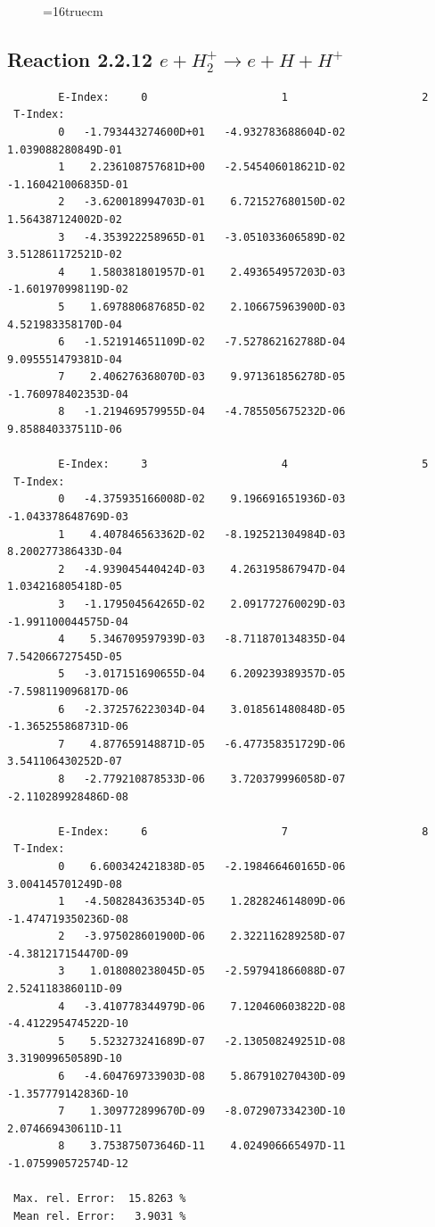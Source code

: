 \documentclass[12pt,dvips]{article}
\begin{document}
\begin{figure} \label{2.2.11}
\epsfxsize=16truecm
\end{figure}
\newpage




\subsection{
Reaction 2.2.12 $  e + H_2^+   \rightarrow  e + H + H^+  $
}



\begin{small}\begin{verbatim}
        E-Index:     0                     1                     2
 T-Index:
        0   -1.793443274600D+01   -4.932783688604D-02    1.039088280849D-01
        1    2.236108757681D+00   -2.545406018621D-02   -1.160421006835D-01
        2   -3.620018994703D-01    6.721527680150D-02    1.564387124002D-02
        3   -4.353922258965D-01   -3.051033606589D-02    3.512861172521D-02
        4    1.580381801957D-01    2.493654957203D-03   -1.601970998119D-02
        5    1.697880687685D-02    2.106675963900D-03    4.521983358170D-04
        6   -1.521914651109D-02   -7.527862162788D-04    9.095551479381D-04
        7    2.406276368070D-03    9.971361856278D-05   -1.760978402353D-04
        8   -1.219469579955D-04   -4.785505675232D-06    9.858840337511D-06

        E-Index:     3                     4                     5
 T-Index:
        0   -4.375935166008D-02    9.196691651936D-03   -1.043378648769D-03
        1    4.407846563362D-02   -8.192521304984D-03    8.200277386433D-04
        2   -4.939045440424D-03    4.263195867947D-04    1.034216805418D-05
        3   -1.179504564265D-02    2.091772760029D-03   -1.991100044575D-04
        4    5.346709597939D-03   -8.711870134835D-04    7.542066727545D-05
        5   -3.017151690655D-04    6.209239389357D-05   -7.598119096817D-06
        6   -2.372576223034D-04    3.018561480848D-05   -1.365255868731D-06
        7    4.877659148871D-05   -6.477358351729D-06    3.541106430252D-07
        8   -2.779210878533D-06    3.720379996058D-07   -2.110289928486D-08

        E-Index:     6                     7                     8
 T-Index:
        0    6.600342421838D-05   -2.198466460165D-06    3.004145701249D-08
        1   -4.508284363534D-05    1.282824614809D-06   -1.474719350236D-08
        2   -3.975028601900D-06    2.322116289258D-07   -4.381217154470D-09
        3    1.018080238045D-05   -2.597941866088D-07    2.524118386011D-09
        4   -3.410778344979D-06    7.120460603822D-08   -4.412295474522D-10
        5    5.523273241689D-07   -2.130508249251D-08    3.319099650589D-10
        6   -4.604769733903D-08    5.867910270430D-09   -1.357779142836D-10
        7    1.309772899670D-09   -8.072907334230D-10    2.074669430611D-11
        8    3.753875073646D-11    4.024906665497D-11   -1.075990572574D-12

 Max. rel. Error:  15.8263 %
 Mean rel. Error:   3.9031 %

\end{verbatim}\end{small}
\end{document}
